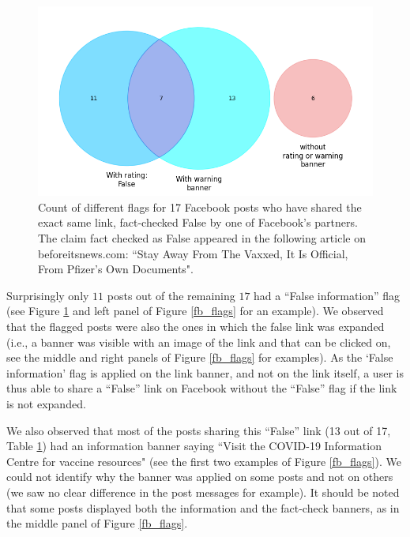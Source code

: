 \documentclass{article}
\begin{document}
\begin{figure}[h]
\centering
\includegraphics[scale=0.5]{../figure/facebook_pie_flags.png}
\caption{Count of different flags for 17 Facebook posts who have shared the exact same link, fact-checked False by one of Facebook’s partners. The claim fact checked as False appeared in the following article on beforeitsnews.com:  ``Stay Away From The Vaxxed, It Is Official, From Pfizer’s Own Documents". }
\label{tab_flags_fb}
\end{figure}

\smallskip

Surprisingly only $11$ posts out of the remaining $17$ had a ``False information'' flag  (see Figure \ref{tab_flags_fb} and left panel of Figure \ref{fb_flags} for an example). We observed that the flagged posts were also the ones in which the false link was expanded (i.e., a banner was visible with an image of the link and that can be clicked on, see the middle and right panels of Figure \ref{fb_flags} for examples). As the ‘False information’ flag is applied on the link banner, and not on the link itself, a user is thus able to share a ``False'' link on Facebook without the ``False'' flag if the link is not expanded.

\smallskip

We also observed that most of the posts sharing this ``False'' link (13 out of 17, Table \ref{tab_flags_fb}) had an information banner saying ``Visit the COVID-19 Information Centre for vaccine resources" (see the first two examples of Figure \ref{fb_flags}). We could not identify why the banner was applied on some posts and not on others (we saw no clear difference in the post messages for example). It should be noted that some posts displayed both the information and the fact-check banners, as in the middle panel of Figure \ref{fb_flags}.
\end{document}
